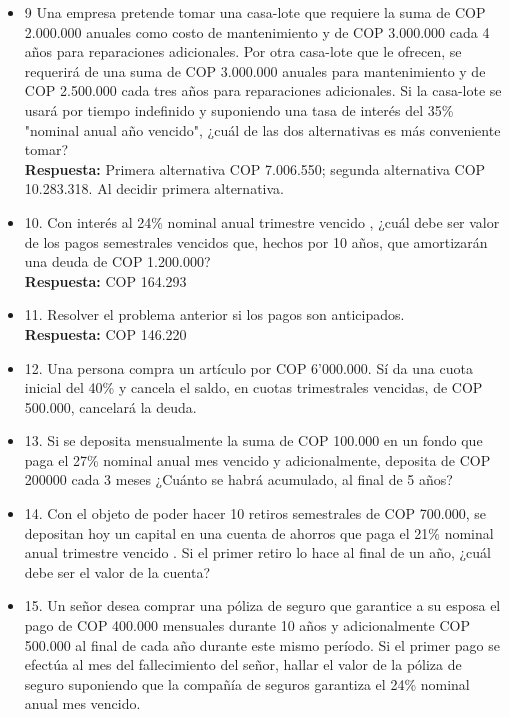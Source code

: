 \begin{itemize}
 \item 9 Una empresa pretende tomar una casa-lote que requiere la suma de COP 2.000.000 anuales como costo de mantenimiento y de COP 3.000.000 cada 4 años para reparaciones adicionales. Por otra casa-lote que le ofrecen, se requerirá de una suma de COP 3.000.000 anuales para mantenimiento y de COP 2.500.000 cada tres años para reparaciones adicionales. Si la casa-lote se usará por tiempo indefinido y suponiendo una tasa de interés del 35\% "nominal anual año vencido", ¿cuál de las dos alternativas es más conveniente tomar?\\
       \textbf{Respuesta:} Primera alternativa COP 7.006.550; segunda alternativa COP 10.283.318. Al decidir primera alternativa.\\
       \medskip

 \item 10. Con interés al 24\%  nominal anual trimestre vencido , ¿cuál debe ser valor de los pagos semestrales vencidos que, hechos por 10 años, que amortizarán una deuda de COP 1.200.000?\\
       \textbf{Respuesta:} COP 164.293
       \medskip

 \item 11. Resolver el problema anterior si los pagos son anticipados.\\
       \textbf{Respuesta:} COP 146.220\\
       \medskip

 \item 12. Una persona compra un artículo por COP 6'000.000. Sí da una cuota inicial del 40\% y cancela el saldo, en cuotas trimestrales vencidas, de COP 500.000, cancelará la deuda.\\
       \medskip

 \item 13. Si se deposita mensualmente la suma de COP 100.000 en un fondo que paga el 27\%  nominal anual mes vencido  y adicionalmente, deposita de COP 200000 cada 3 meses ¿Cuánto se habrá acumulado, al final de 5 años?
       \medskip

 \item 14. Con  el objeto de poder hacer 10 retiros semestrales de COP 700.000, se depositan hoy un capital en una cuenta de ahorros que paga el 21\%  nominal anual trimestre vencido . Si el primer retiro lo hace al final de un año, ¿cuál debe ser el valor de la cuenta?
       \medskip

 \item 15. Un señor desea comprar una póliza de seguro que garantice a su esposa el pago de COP 400.000 mensuales durante 10 años y adicionalmente COP 500.000 al final de cada año durante este mismo período. Si el primer pago se efectúa al mes del fallecimiento del señor, hallar el valor de la póliza de seguro suponiendo que la compañía de seguros garantiza el 24\%  nominal anual mes vencido.\\
       \medskip


\end{itemize}
